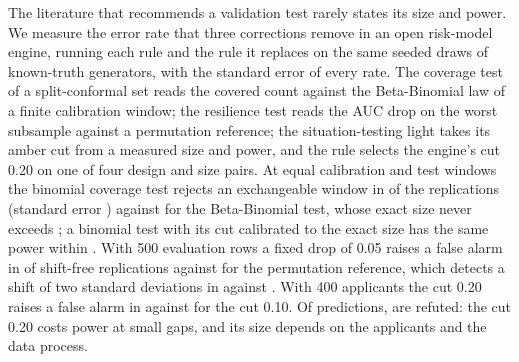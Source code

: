 The literature that recommends a validation test rarely states its size and power. We measure the error rate that three corrections remove in an open risk-model engine, running each rule and the rule it replaces on the same seeded draws of known-truth generators, with the standard error of every rate. The coverage test of a split-conformal set reads the covered count against the Beta-Binomial law of a finite calibration window; the resilience test reads the AUC drop on the worst subsample against a permutation reference; the situation-testing light takes its amber cut from a measured size and power, and the rule selects the engine's cut 0.20 on one of four design and size pairs. At equal calibration and test windows the binomial coverage test rejects an exchangeable window in \CovSinBinB{} of the replications (standard error \CovSeBinB{}) against \CovSinBBB{} for the Beta-Binomial test, whose exact size never exceeds \CovBBMaxExact{}; a binomial test with its cut calibrated to the exact size has the same power within \ExPowGapMax{}. With 500 evaluation rows a fixed drop of 0.05 raises a false alarm in \ShRateFixedFiveCZ{} of shift-free replications against \ShRatePermCZ{} for the permutation reference, which detects a shift of two standard deviations in \ShRatePermCT{} against \ShRateFixedFiveCT{}. With 400 applicants the cut 0.20 raises a false alarm in \SiRateCutTwentySmallZ{} against \SiRateCutTenSmallZ{} for the cut 0.10. Of \HypTotal{} predictions, \HypRefuted{} are refuted: the cut 0.20 costs power at small gaps, and its size depends on the applicants and the data process.
